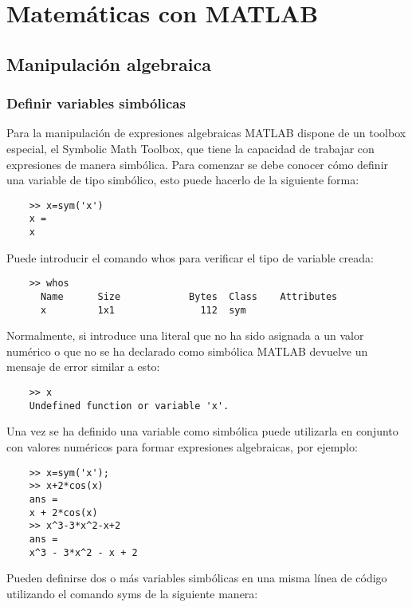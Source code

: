 \chapter{Matemáticas con MATLAB}

\section{Manipulación algebraica}

\subsection{Definir variables simbólicas}

Para la manipulación de expresiones algebraicas MATLAB dispone de un toolbox especial, 
el Symbolic Math Toolbox, que  tiene la capacidad de trabajar con expresiones de manera 
simbólica. Para comenzar se debe conocer cómo definir una variable de tipo simbólico, 
esto puede hacerlo de la siguiente forma:

\begin{verbatim}
	>> x=sym('x')
	x =
	x
\end{verbatim}

Puede introducir el comando whos para verificar el tipo de variable creada:

\begin{verbatim}
	>> whos
	  Name      Size            Bytes  Class    Attributes
	  x         1x1               112  sym         
\end{verbatim}

Normalmente, si introduce una literal que no ha sido asignada a un valor numérico o que no 
se ha declarado como simbólica MATLAB devuelve un mensaje de error similar a esto:

\begin{verbatim}
	>> x
	Undefined function or variable 'x'.
\end{verbatim}

Una vez se ha definido una variable como simbólica puede utilizarla en conjunto con valores 
numéricos para formar expresiones algebraicas, por ejemplo:

\begin{verbatim}
	>> x=sym('x');
	>> x+2*cos(x)
	ans =
	x + 2*cos(x)
	>> x^3-3*x^2-x+2
	ans = 
	x^3 - 3*x^2 - x + 2
\end{verbatim}

Pueden definirse dos o más variables simbólicas en una misma línea de código utilizando el 
comando syms de la siguiente manera:

